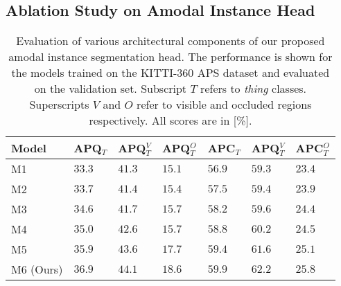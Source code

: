 \documentclass[10pt,twocolumn,letterpaper]{article}
\begin{document}
\subsection{Ablation Study on Amodal Instance Head}
\label{sec:aih}

\begin{table}
\footnotesize 
\centering
\begin{tabular}{p{2.0cm}|p{0.5cm}p{0.5cm}p{0.5cm}p{0.5cm}p{0.5cm}p{0.5cm}}
\toprule
Model &  APQ$_T$&  APQ$^V_T$ &  APQ$^O_T$ & APC$_T$& APQ$^V_T$ & APC$^O_T$ \\
\midrule
M1  &$33.3$ & $41.3$ &$15.1$ &  $56.9$ &$59.3$ & $23.4$   \\
M2  &$33.7$ & $41.4$ &$15.4$ &  $57.5$ &$59.4$ & $23.9$   \\
M3  & $34.6$ & $41.7$ &$15.7$ &  $58.2$ &$59.6$ & $24.4$  \\
M4  &$35.0$ & $42.6$ &$15.7$ &  $58.8$ &$60.2$ & $24.5$   \\
M5  &$35.9$ & $43.6$ &$17.7$ &  $59.4$ &$61.6$ & $25.1$   \\
M6 (Ours)  &$\mathbf{36.9}$ & $\mathbf{44.1}$ &$\mathbf{18.6}$ &  $\mathbf{59.9}$ &$\mathbf{62.2}$ & $\mathbf{25.8}$   \\
\bottomrule
\end{tabular}
\vspace{-0.2cm}
\caption{Evaluation of various architectural components of our proposed amodal instance segmentation head. The performance is shown for the models trained on the KITTI-360 APS dataset and evaluated on the validation set. Subscript $T$ refers to \textit{thing} classes. Superscripts $V$ and $O$ refer to visible and occluded regions respectively. All scores are in [\%].}
\label{tab:instanceHeadEvaluation}
\vspace{-0.4cm}
\end{table}
\end{document}
